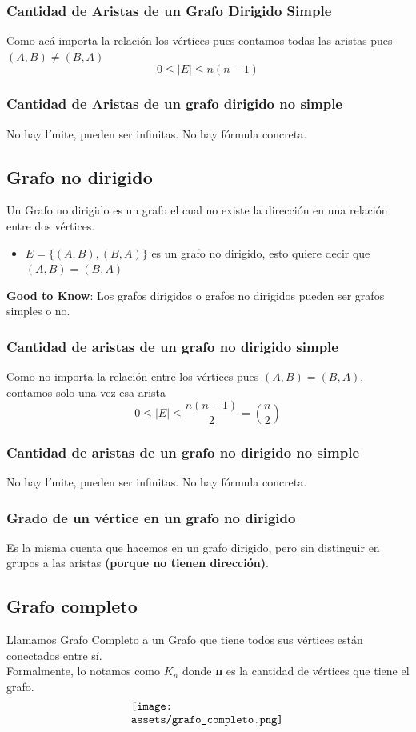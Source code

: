 \documentclass[10pt,a4paper]{article}
\begin{document}
\subsubsection*{Cantidad de Aristas de un Grafo Dirigido Simple}
Como acá importa la relación los vértices pues contamos todas las aristas pues $(A,B) \neq (B,A)$ \[0 \leq |E| \leq n(n-1)\]
\subsubsection*{Cantidad de Aristas de un grafo dirigido no simple}
No hay límite, pueden ser infinitas. No hay fórmula concreta.
\subsection*{Grafo no dirigido}
Un Grafo no dirigido es un grafo el cual no existe la dirección en una relación entre dos vértices.
\begin{itemize}
    \item $E = \{(A,B), (B, A) \}$ es un grafo no dirigido, esto quiere decir que $(A,B) = (B, A)$
\end{itemize}
\textbf{Good to Know}: Los grafos dirigidos o grafos no dirigidos pueden ser grafos simples o no.
\subsubsection*{Cantidad de aristas de un grafo no dirigido simple}
Como no importa la relación entre los vértices pues $(A,B) = (B,A)$, contamos solo una vez esa arista \[0 \leq |E| \leq \frac{n(n-1)}{2} = \binom{n}{2}\]
\subsubsection*{Cantidad de aristas de un grafo no dirigido no simple}
No hay límite, pueden ser infinitas. No hay fórmula concreta.
\subsubsection*{Grado de un vértice en un grafo no dirigido}
Es la misma cuenta que hacemos en un grafo dirigido, pero sin distinguir en grupos a las aristas \textbf{(porque no tienen dirección)}.
\subsection*{Grafo completo}
Llamamos Grafo Completo a un Grafo que tiene todos sus vértices están conectados entre sí. \\
Formalmente, lo notamos como $K_{n}$ donde \textbf{n} es la cantidad de vértices que tiene el grafo.
\[\begin{minipage}[b]{0.4\textwidth} 
    \texttt{[image: assets/grafo\_completo.png]}
\end{minipage}\]
\end{document}
